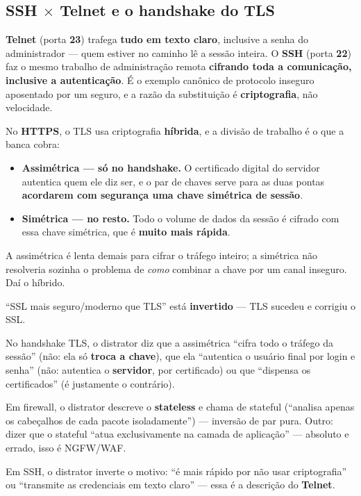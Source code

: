 \subsection{SSH $\times$ Telnet e o handshake do TLS}

\textbf{Telnet} (porta \textbf{23}) trafega \textbf{tudo em texto claro},
inclusive a senha do administrador --- quem estiver no caminho lê a sessão
inteira. O \textbf{SSH} (porta \textbf{22}) faz o mesmo trabalho de
administração remota \textbf{cifrando toda a comunicação, inclusive a
autenticação}. É o exemplo canônico de protocolo inseguro aposentado por um
seguro, e a razão da substituição é \textbf{criptografia}, não velocidade.

No \textbf{HTTPS}, o TLS usa criptografia \textbf{híbrida}, e a divisão de
trabalho é o que a banca cobra:

\begin{itemize}
\item \textbf{Assimétrica --- só no handshake.} O certificado digital do
servidor autentica quem ele diz ser, e o par de chaves serve para as duas
pontas \textbf{acordarem com segurança uma chave simétrica de sessão}.
\item \textbf{Simétrica --- no resto.} Todo o volume de dados da sessão é
cifrado com essa chave simétrica, que é \textbf{muito mais rápida}.
\end{itemize}

A assimétrica é lenta demais para cifrar o tráfego inteiro; a simétrica não
resolveria sozinha o problema de \emph{como} combinar a chave por um canal
inseguro. Daí o híbrido.

\begin{pegadinha}
``SSL mais seguro/moderno que TLS'' está \textbf{invertido} --- TLS sucedeu e
corrigiu o SSL.

No handshake TLS, o distrator diz que a assimétrica ``cifra todo o tráfego da
sessão'' (não: ela só \textbf{troca a chave}), que ela ``autentica o usuário
final por login e senha'' (não: autentica o \textbf{servidor}, por
certificado) ou que ``dispensa os certificados'' (é justamente o contrário).

Em firewall, o distrator descreve o \textbf{stateless} e chama de stateful
(``analisa apenas os cabeçalhos de cada pacote isoladamente'') --- inversão
de par pura. Outro: dizer que o stateful ``atua exclusivamente na camada de
aplicação'' --- absoluto e errado, isso é NGFW/WAF.

Em SSH, o distrator inverte o motivo: ``é mais rápido por não usar
criptografia'' ou ``transmite as credenciais em texto claro'' --- essa é a
descrição do \textbf{Telnet}.
\end{pegadinha}

